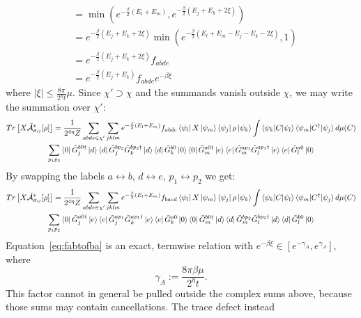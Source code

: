 \documentclass[aps,floatfix,10pt,amssymb,amsfont,amsmath,superscriptaddress,float,nofootinbib,longbibliography,nobalancelastpage,twocolumn]{revtex4-2}
\begin{document}
\begin{widetext}
\begin{equation}
\begin{aligned}
    &= \min(e^{-\frac{\beta}{2}(E_l+E_m)}, e^{-\frac{\beta}{2}(E_j+E_k + 2\xi)})\\
    &= e^{-\frac{\beta}{2}(E_j+E_k + 2\xi)} \min(e^{-\frac{\beta}{2}(E_l+E_m-E_j-E_k-2\xi)},1)\\
    &= e^{-\frac{\beta}{2}(E_j+E_k + 2\xi)}f_{abde}\\
    &= e^{-\frac{\beta}{2}(E_j+E_k)}f_{abde}e^{-\beta\xi}
\end{aligned}
\label{eq:fabtofba}
\end{equation}
where $|\xi| \leq \frac{8\pi}{2^{\eta}t}\mu$. Since $\chi'\supset\chi$ and the summands vanish outside $\chi$, we may write the summation over $\chi'$:
\begin{multline}
   Tr\left[X\tilde{\mathcal{A}}^*_{\sigma_G}[\rho]\right] =\frac{1}{2^{4\eta}Z} \sum_{abde\in \chi'}\sum_{jklm} e^{-\frac{\beta}{2}(E_l+E_m)}f_{abde} \bra{\psi_l}X\ket{\psi_m}\bra{\psi_j}\rho\ket{\psi_k} \int \braket{\psi_k|C|\psi_l}\braket{\psi_m|C^{\dagger}|\psi_j} d\mu(C)\\\sum_{p_1p_2} \bra{0} \tilde G^{b0\dagger}_j\ket{d}\bra{d}\tilde G^{bp_2}_j\tilde G^{bp_2\dagger}_k\ket{d}\bra{d}\tilde G^{b0}_k\ket{0}
    \bra{0}\tilde G_m^{a0\dagger}\ket{e}\bra{e}\tilde G_m^{ap_1}\tilde G_l^{ap_1\dagger}\ket{e}\bra{e}\tilde G_l^{a0}\ket{0}
\end{multline}
By swapping the labels $a \leftrightarrow b$, $d \leftrightarrow e$, $p_1 \leftrightarrow p_2$ we get:
\begin{multline}
    Tr\left[X\tilde{\mathcal{A}}^*_{\sigma_G}[\rho]\right] =\frac{1}{2^{4\eta}Z} \sum_{abde\in \chi'}\sum_{jklm} e^{-\frac{\beta}{2}(E_l+E_m)}f_{baed} \bra{\psi_l}X\ket{\psi_m}\bra{\psi_j}\rho\ket{\psi_k} \int \braket{\psi_k|C|\psi_l}\braket{\psi_m|C^{\dagger}|\psi_j} d\mu(C)\\\sum_{p_1p_2} \bra{0} \tilde G^{a0\dagger}_j\ket{e}\bra{e}\tilde G^{ap_1}_j\tilde G^{ap_1\dagger}_k\ket{e}\bra{e}\tilde G^{a0}_k\ket{0}
    \bra{0}\tilde G_m^{b0\dagger}\ket{d}\bra{d}\tilde G_m^{bp_2}\tilde G_l^{bp_2\dagger}\ket{d}\bra{d}\tilde G_l^{b0}\ket{0}
\end{multline}
Equation~\eqref{eq:fabtofba} is an exact, termwise relation with
$e^{-\beta\xi}\in[e^{-\gamma_A},e^{\gamma_A}]$, where
\begin{equation}
 \gamma_A:=\frac{8\pi\beta\mu}{2^\eta t}.
 \label{eq:gamma_A}
\end{equation}
This factor cannot in general be pulled outside the complex sums above,
because those sums may contain cancellations.  The trace defect instead

\end{widetext}
\end{document}
